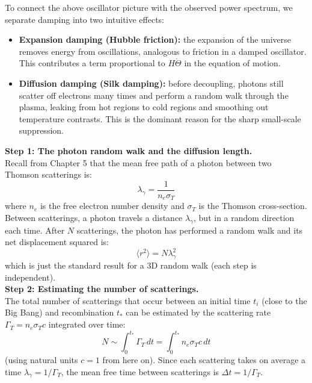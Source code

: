 \clearpage
\begin{foundation}
    To connect the above oscillator picture with the observed power spectrum, we separate damping into two intuitive effects:
    \begin{itemize}
        \item \textbf{Expansion damping (Hubble friction):} the expansion of the universe removes energy from oscillations, analogous to friction in a damped oscillator. This contributes a term proportional to $H\dot{\Theta}$ in the equation of motion.
        \item \textbf{Diffusion damping (Silk damping):} before decoupling, photons still scatter off electrons many times and perform a random walk through the plasma, leaking from hot regions to cold regions and smoothing out temperature contrasts. This is the dominant reason for the sharp small-scale suppression.
    \end{itemize}

    \textbf{Step 1: The photon random walk and the diffusion length.} \\
    Recall from Chapter 5 that the mean free path of a photon between two Thomson scatterings is:
    \[
        \lambda_\gamma = \frac{1}{n_e \sigma_T}
    \]
    where $n_e$ is the free electron number density and $\sigma_T$ is the Thomson cross-section. Between scatterings, a photon travels a distance $\lambda_\gamma$, but in a random direction each time. After $N$ scatterings, the photon has performed a random walk and its net displacement squared is:
    \[
        \langle r^2 \rangle = N \lambda_\gamma^2
    \]
    which is just the standard result for a 3D random walk (each step is independent). \\

    \textbf{Step 2: Estimating the number of scatterings.} \\
    The total number of scatterings that occur between an initial time $t_i$ (close to the Big Bang) and recombination $t_*$ can be estimated by the scattering rate $\Gamma_T = n_e \sigma_T c$ integrated over time:
    \[
        N \sim \int_0^{t_*} \Gamma_T \, dt = \int_0^{t_*} n_e \sigma_T c \, dt
    \]
    (using natural units $c = 1$ from here on). Since each scattering takes on average a time $\lambda_\gamma = 1/\Gamma_T$, the mean free time between scatterings is $\Delta t = 1/\Gamma_T$. \\


\end{foundation}
